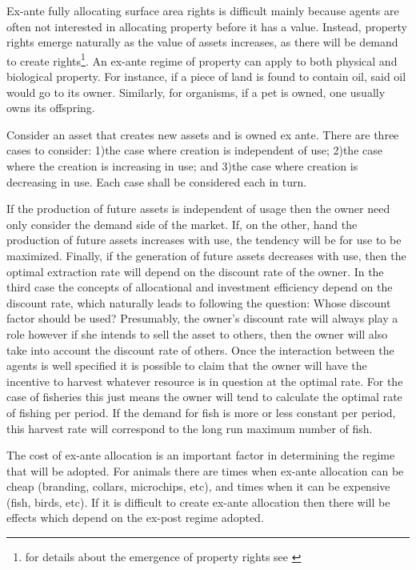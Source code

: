 Ex-ante fully allocating surface area rights is difficult mainly because agents are often not interested in allocating property before it has a value. Instead, property rights emerge naturally as the value of assets increases, as there will be demand to create rights\footnote{for details about the emergence of property rights see \cite{Alchian1973}}. An ex-ante regime of property can apply to both physical and biological property. For instance, if a piece of land is found to contain oil, said oil would go to its owner. Similarly, for organisms, if a pet is owned, one usually owns its offspring.

Consider an asset that creates new assets and is owned ex ante. There are three cases to consider: 1)the case where creation is independent of use; 2)the case where the creation is increasing in use; and 3)the case where creation is decreasing in use. Each case shall be considered each in turn. 

If the production of future assets is independent of usage then the owner need only consider the demand side of the market. If, on the other, hand the production of future assets increases with use, the tendency will be for use to be maximized. Finally, if the generation of future assets decreases with use, then the optimal extraction rate will depend on the discount rate of the owner. In the third case the concepts of allocational and investment efficiency depend on the discount rate, which naturally leads to following the question: Whose discount factor should be used? Presumably, the owner's discount rate will always play a role however if she intends to sell the asset to others, then the owner will also take into account the discount rate of others. Once the interaction between the agents is well specified it is possible to claim that the owner will have the incentive to harvest whatever resource is in question at the optimal rate. For the case of fisheries this just means the owner will tend to calculate the optimal rate of fishing per period. If the demand for fish is more or less constant per period, this harvest rate will correspond to the long run maximum number of fish.

The cost of ex-ante allocation is an important factor in determining the regime that will be adopted. For animals there are times when ex-ante allocation can be cheap (branding, collars, microchips, etc), and times when it can be expensive (fish, birds, etc). If it is difficult to create ex-ante allocation then there will be effects which depend on the ex-post regime adopted.

